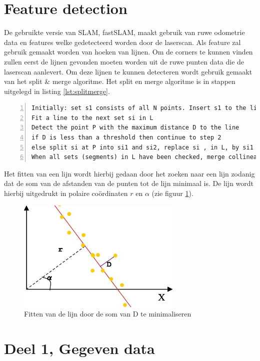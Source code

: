 \documentclass[a4paper]{article}
\begin{document}
\section{Feature detection}
De gebruikte versie van SLAM, fastSLAM, maakt gebruik van ruwe odometrie data en features welke gedetecteerd worden door de laserscan.
Als feature zal gebruik gemaakt worden van hoeken van lijnen. Om de corners te kunnen vinden zullen eerst de lijnen gevonden moeten worden uit de ruwe punten data die de laserscan aanlevert. Om deze lijnen te kunnen detecteren wordt gebruik gemaakt van het split \& merge algoritme. Het split en merge algoritme is in stappen uitgelegd in listing \ref{lst:splitmerge}.

\begin{lstlisting}[caption= Split \& merge algorithm, label=lst:splitmerge, numbers=left]
Initially: set s1 consists of all N points. Insert s1 to the list L. Set index i=1
Fit a line to the next set si in L
Detect the point P with the maximum distance D to the line
if D is less than a threshold then continue to step 2
else split si at P into si1 and si2, replace si , in L, by si1 and si2. Continue to step 2
When all sets (segments) in L have been checked, merge collinear segments.
\end{lstlisting}

\noindent Het fitten van een lijn wordt hierbij gedaan door het zoeken naar een lijn zodanig dat de som van de afstanden van de punten tot de lijn minimaal is. De lijn wordt hierbij uitgedrukt in polaire co\"ordinaten $r$ en $\alpha$ (zie figuur \ref{fig:linefit}).

\begin{figure}[h]
	\centering
	\includegraphics[width=0.7\textwidth]{img/stolenline.png}
	\caption{Fitten van de lijn door de som van D te minimaliseren}
	\label{fig:linefit}
\end{figure}


\section{Deel 1, Gegeven data}
\end{document}
